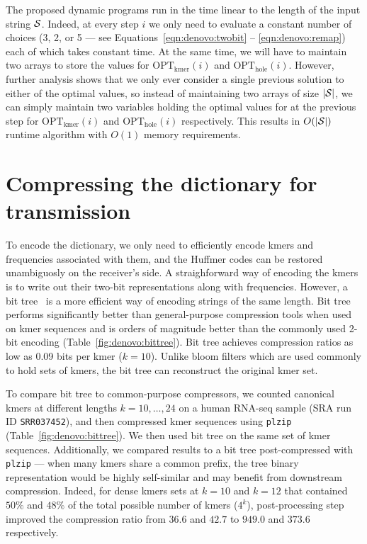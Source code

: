 \documentclass[12pt]{cmuthesis}
\begin{document}
  The proposed dynamic programs run in the time linear to the length of the input string $\mathcal{S}$. Indeed, at every step $i$ we only need to evaluate a constant number of choices (3, 2, or 5 --- see Equations~\ref{eqn:denovo:twobit} -- \ref{eqn:denovo:remap}) each of which takes constant time. At the same time, we will have to maintain two arrays to store the values for $\mathrm{OPT_{kmer}}(i)$ and $\mathrm{OPT_{hole}}(i)$. However, further analysis shows that we only ever consider a single previous solution to either of the optimal values, so instead of maintaining two arrays of size $|\mathcal{S}|$, we can simply maintain two variables holding the optimal values for at the previous step for $\mathrm{OPT_{kmer}}(i)$ and $\mathrm{OPT_{hole}}(i)$ respectively. This results in $O(|\mathcal{S}|)$ runtime algorithm with $O(1)$ memory requirements.

%
\section{Compressing the dictionary for transmission}

To encode the dictionary, we only need to efficiently encode kmers and frequencies associated with them, and the Huffmer codes can be restored unambiguosly on the receiver's side. A straighforward way of encoding the kmers is to write out their two-bit representations along with frequencies. However, a bit tree~\cite{PathEncode} is a more efficient way of encoding strings of the same length. Bit tree performs significantly better than general-purpose compression tools when used on kmer sequences and is orders of magnitude better than the commonly used 2-bit encoding (Table~\ref{fig:denovo:bittree}). Bit tree achieves compression ratios as low as 0.09 bits per kmer ($k=10$). Unlike bloom filters which are used commonly to hold sets of kmers, the bit tree can reconstruct the original kmer set.

To compare bit tree to common-purpose compressors, we counted canonical kmers at different lengths $k = 10, \ldots, 24$ on a human RNA-seq sample (SRA run ID \texttt{SRR037452}), and then compressed kmer sequences using \texttt{plzip} (Table~\ref{fig:denovo:bittree}). We then used bit tree on the same set of kmer sequences. Additionally, we compared results to a bit tree post-compressed with \texttt{plzip} --- when many kmers share a common prefix, the tree binary representation would be highly self-similar and may benefit from downstream compression. Indeed, for dense kmers sets at $k=10$ and $k=12$ that contained $50\%$ and $48\%$ of the total possible number of kmers ($4^k$), post-processing step improved the compression ratio from $36.6$ and $42.7$ to $949.0$ and $373.6$ respectively.
\end{document}
